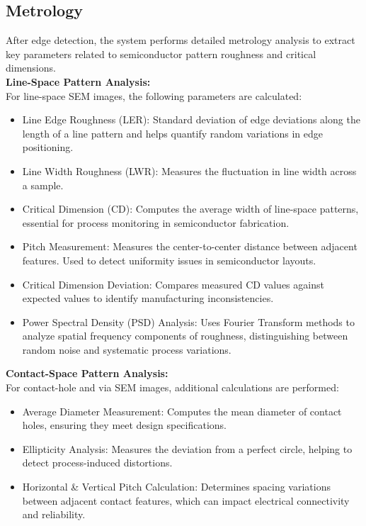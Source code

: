 \documentclass[12pt,oneside,letterpaper,english]{article}
\begin{document}
\subsection{Metrology}
After edge detection, the system performs detailed metrology analysis to extract key parameters related to semiconductor pattern roughness and critical dimensions.\\

\textbf{Line-Space Pattern Analysis:}\\
For line-space SEM images, the following parameters are calculated:

\begin{itemize}
	\item Line Edge Roughness (LER): Standard deviation of edge deviations along the length of a line pattern and helps quantify random variations in edge positioning.
	\item Line Width Roughness (LWR): Measures the fluctuation in line width across a sample.
	\item Critical Dimension (CD): Computes the average width of line-space patterns, essential for process monitoring in semiconductor fabrication.
	\item Pitch Measurement: Measures the center-to-center distance between adjacent features.
	Used to detect uniformity issues in semiconductor layouts.
	\item Critical Dimension Deviation: Compares measured CD values against expected values to identify manufacturing inconsistencies.
	\item Power Spectral Density (PSD) Analysis: Uses Fourier Transform methods to analyze spatial frequency components of roughness, distinguishing between random noise and systematic process variations.
\end{itemize}

\textbf{Contact-Space Pattern Analysis:}\\
For contact-hole and via SEM images, additional calculations are performed:

\begin{itemize}
	\item Average Diameter Measurement: Computes the mean diameter of contact holes, ensuring they meet design specifications.
	\item Ellipticity Analysis: Measures the deviation from a perfect circle, helping to detect process-induced distortions.
	\item Horizontal \& Vertical Pitch Calculation: Determines spacing variations between adjacent contact features, which can impact electrical connectivity and reliability.
\end{itemize}
\end{document}
